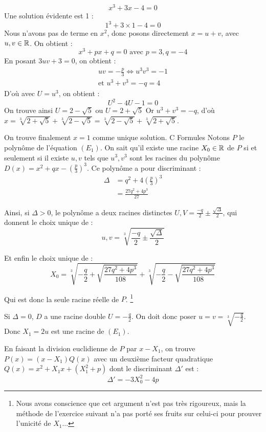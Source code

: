 \documentclass[]{../templates/homework}
\begin{document}
	$$ x^3 + 3x - 4 = 0$$
	\question Une solution évidente est 1 : $$1^3 + 3\times1 - 4 = 0$$
	\question Nous n'avons pas de terme en $x^2$, donc posons directement $x = u+v$, avec $u, v \in \mathbb R$.
	On obtient : $$x^3 + px + q = 0 \text{ avec } p=3, q=-4$$
	En posant $3uv + 3 = 0$, on obtient : 
\begin{align*}
 uv = -\frac{p}{3} \iff u^3v^3 = -1 \\
\text{et } u^3 + v^3 = -q = 4
\end{align*}
	D'où avec $U = u^3$, on obtient : $$U^2 -4U -1 =0$$
	On trouve ainsi $U = 2 - \sqrt{5}$ ou $U = 2 + \sqrt{5}$
	Or $u^3 + v^3 = -q$, d'où $x = \sqrt[3]{2+\sqrt{5}} + \sqrt[3]{2-\sqrt{5}} = \sqrt[3]{2-\sqrt{5}} + \sqrt[3]{2+\sqrt{5}}$.
	
On trouve finalement $x=1$ comme unique solution.
	\partie C {Formules}
	 Notons $P$ le polynôme de l'équation $(E_1)$. On sait qu'il existe une racine $X_0 \in \mathbb R$ de $P$ si et seulement si il existe $u,v$ tels que $u^3,v^3$ sont les racines du polynôme $D(x) = x^2 + qx - \left(\frac p 3\right)^3$.
	Ce polynôme a pour discriminant :
	\begin{align*}
		\Delta &= q^2 + 4\left(\frac p 3\right)^3 \\
		&=  \frac {27q^2 + 4p^3}{27}
	\end{align*}
	
	
	Ainsi, si $\Delta > 0$, le polynôme a deux racines distinctes $U,V = \frac {-q}{2} \pm \frac {\sqrt \Delta} {2}$, qui donnent le choix unique de :
	$$u,v = \sqrt[3]{\frac {-q}{2} \pm \frac {\sqrt \Delta} {2}}$$
	
	Et enfin le choix unique de :
	$$X_0 = \sqrt[3]{-\frac {q}{2} + \sqrt {\frac {27q^2 + 4p^3}{108}} } + \sqrt[3]{-\frac {q}{2} - \sqrt {\frac {27q^2 + 4p^3}{108}} }$$
	
	Qui est donc la seule racine réelle de $P$. \footnote{Nous avons conscience que cet argument n'est pas très rigoureux, mais la méthode de l'exercice suivant n'a pas porté ses fruits sur celui-ci pour prouver l'unicité de $X_1$...}
	
	\subproblem Si $\Delta = 0$, $D$ a une racine double $U = -\frac q {2}$. On doit donc poser $u = v = \sqrt[3]{-\frac q 2}$. Donc $X_1 = 2u$ est une racine de $(E_1)$.
	
	
	En faisant la division euclidienne de $P$ par $x-X_1$, on trouve $P(x) = (x-X_1)Q(x)$ avec un deuxième facteur quadratique $Q(x) = x^2 + X_1x + (X_1^2 + p)$ dont le discriminant $\Delta'$ est :
	$$\Delta' = -3X_0^2 - 4p$$
	
\end{document}
